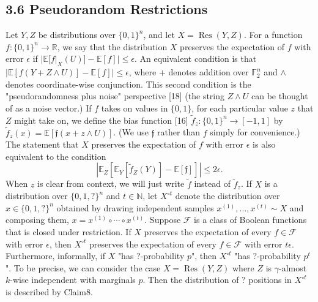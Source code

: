 \subsection*{3.6 Pseudorandom Restrictions}
Let $Y,Z$ be distributions over $\{0,1\}^n$, and let $X=\operatorname{Res}(Y,Z)$. For a function $f:\{0,1\}^n\to\mathbb R$, we say that the distribution $X$ preserves the expectation of $f$ with error $\epsilon$ if $|\mathbb E[f|_X(U)]-\mathbb E[f]|\le\epsilon$.
An equivalent condition is that $|\mathbb E[f(Y+Z\wedge U)]-\mathbb E[f]|\le\epsilon$, where $+$ denotes addition over $\mathbb F_2^n$ and $\wedge$ denotes coordinate-wise conjunction. This second condition is the "pseudorandomness plus noise" perspective [18] (the string $Z\wedge U$ can be thought of as a noise vector.)
If $f$ takes on values in $\{0,1\}$, for each particular value $z$ that $Z$ might take on, we define the bias function [16] $\widetilde f_z:\{0,1\}^n\to[-1,1]$ by $\widetilde f_z(x)=\mathbb E[\mathfrak f(x+z\wedge U)]$. (We use $\mathfrak f$ rather than $f$ simply for convenience.) The statement that $X$ preserves the expectation of $f$ with error $\epsilon$ is also equivalent to the condition
\[
\left|\mathbb E_Z[\mathbb E_Y[\widetilde f_Z(Y)]-\mathbb E[\mathfrak f]]\right|\le2\epsilon.
\]
When $z$ is clear from context, we will just write $\widetilde f$ instead of $\widetilde f_z$.
If $X$ is a distribution over $\{0,1,?\}^n$ and $t\in\mathbb N$, let $X^{\circ t}$ denote the distribution over $x\in\{0,1,?\}^n$ obtained by drawing independent samples $x^{(1)},\ldots,x^{(t)}\sim X$ and composing them, $x=x^{(1)}\circ\cdots\circ x^{(t)}$.
Suppose $\mathcal F$ is a class of Boolean functions that is closed under restriction. If $X$ preserves the expectation of every $f\in\mathcal F$ with error $\epsilon$, then $X^{\circ t}$ preserves the expectation of every $f\in\mathcal F$ with error $t\epsilon$. Furthermore, informally, if $X$ "has ?-probability $p$", then $X^{\circ t}$ "has ?-probability $p^t$". To be precise, we can consider the case $X=\operatorname{Res}(Y,Z)$ where $Z$ is $\gamma$-almost $k$-wise independent with marginals $p$. Then the distribution of ? positions in $X^{\circ t}$ is described by Claim8.
